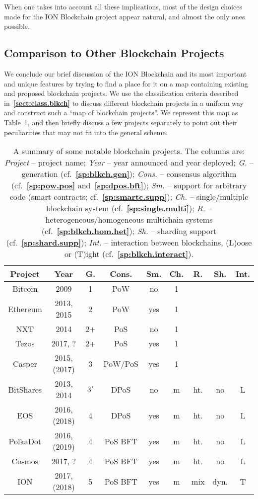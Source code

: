 \documentclass[12pt,oneside]{article}
\def\refpoint#1{{\rm\textbf{\ref{#1}}}}
\let\ptref=\refpoint
\def\mysubsection#1{\subsection{#1}\fancyhead[C]{\small{\textsc{\textrm{\thesubsection.} #1}}}}
\begin{document}
When one takes into account all these implications, most of the design
choices made for the ION Blockchain project appear natural, and almost
the only ones possible.

\mysubsection{Comparison to Other Blockchain
  Projects}\label{sect:compare.blkch}

We conclude our brief discussion of the ION Blockchain and its most
important and unique features by trying to find a place for it on a
map containing existing and proposed blockchain projects. We use the
classification criteria described in~\ptref{sect:class.blkch} to
discuss different blockchain projects in a uniform way and construct
such a ``map of blockchain projects''. We represent this map as
Table~\ref{tab:blkch.proj}, and then briefly discuss a few projects
separately to point out their peculiarities that may not fit into the
general scheme.

\begin{table}
  \captionsetup{font=scriptsize}
  \begin{tabular}{|c|cc|ccc|ccc|}
    \hline Project & Year & G. & Cons. & Sm. & Ch. & R. & Sh. &
    Int. \\ \hline Bitcoin & 2009 & 1 & PoW & no & 1 \\ Ethereum &
    2013, 2015 & 2 & PoW & yes & 1 \\ NXT & 2014 & 2+ & PoS & no & 1
    \\ Tezos & 2017, ? & 2+ & PoS & yes & 1 \\ Casper & 2015, (2017) &
    3 & PoW/PoS & yes & 1 \\ \hline BitShares & 2013, 2014 & $3'$ &
    DPoS & no & m & ht. & no & L \\ EOS & 2016, (2018) & 4 & DPoS &
    yes & m & ht. & no & L \\ PolkaDot & 2016, (2019) & 4 & PoS BFT & yes &
    m & ht. & no & L \\ Cosmos & 2017, ?  & 4 & PoS BFT & yes & m &
    ht. & no & L \\ ION & 2017, (2018) & 5 & PoS BFT & yes & m & mix &
    dyn. & T \\ \hline
  \end{tabular}
  \caption{A summary of some notable blockchain projects. The columns
    are: {\em Project} -- project name; {\em Year} -- year announced
    and year deployed; {\em G.} -- generation
    (cf.~\ptref{sp:blkch.gen}); {\em Cons.} -- consensus algorithm
    (cf.~\ptref{sp:pow.pos} and~\ptref{sp:dpos.bft}); {\em Sm.} --
    support for arbitrary code (smart contracts;
    cf.~\ptref{sp:smartc.supp}); {\em Ch.} -- single/multiple
    blockchain system (cf.~\ptref{sp:single.multi}); {\em R.} --
    heterogeneous/homogeneous multichain systems
    (cf.~\ptref{sp:blkch.hom.het}); {\em Sh.} -- sharding support
    (cf.~\ptref{sp:shard.supp}); {\em Int.} -- interaction between
    blockchains, (L)oose or (T)ight (cf.~\ptref{sp:blkch.interact}).
  }\label{tab:blkch.proj}
\end{table}
\end{document}
